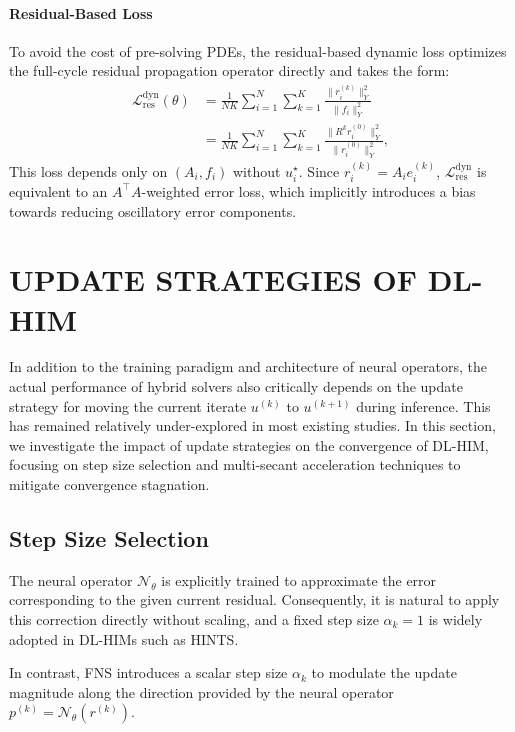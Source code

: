 \documentclass[11pt]{article}
\begin{document}
\paragraph{Residual-Based Loss}
To avoid the cost of pre-solving PDEs, the residual-based dynamic loss optimizes the full-cycle residual propagation operator directly and takes the form:
\begin{equation}
    \begin{aligned}
        \mathcal{L}_{\mathrm{res}}^\mathrm{dyn}(\theta) & =\frac{1}{NK}\sum_{i=1}^{N}\sum_{k=1}^{K}\frac{\|r_{i}^{(k)}\|_{Y}^{2}}{\|f_{i}\|_{Y}^{2}}
        \\&=\frac{1}{NK}\sum_{i=1}^{N}\sum_{k=1}^{K}\frac{\|R^{k}r_i^{(0)}\|_{Y}^{2}}{\|r_{i}^{(0)}\|_{Y}^{2}},
    \end{aligned}
\end{equation}
This loss depends only on $(A_i,f_i)$ without $u_i^\star$. Since $r_i^{(k)} = A_i e_i^{(k)}$, $\mathcal{L}_{\mathrm{res}}^\mathrm{dyn}$ is equivalent to an $A^\top A$-weighted error loss, which implicitly introduces a bias towards reducing oscillatory error components.

\section{UPDATE STRATEGIES OF DL-HIM}\label{sec:update_strategy}
In addition to the training paradigm and architecture of neural operators, the actual performance of hybrid solvers also critically depends on the update strategy for moving the current iterate $u^{(k)}$ to $u^{(k+1)}$ during inference. This has remained relatively under-explored in most existing studies. In this section, we investigate the impact of update strategies on the convergence of DL-HIM, focusing on step size selection and multi-secant acceleration techniques to mitigate convergence stagnation.

\subsection{Step Size Selection}
The neural operator $\mathcal{N}_\theta$ is explicitly trained to approximate the error corresponding to the given current residual. Consequently, it is natural to apply this correction directly without scaling, and a fixed step size $\alpha_k=1$ is widely adopted in DL-HIMs such as HINTS\cite{zhang2024blending}.

In contrast, FNS\cite{cui2025hybrid} introduces a scalar step size $\alpha_k$ to modulate the update magnitude along the direction provided by the neural operator $p^{(k)} = \mathcal{N}_\theta(r^{(k)})$.
\end{document}
